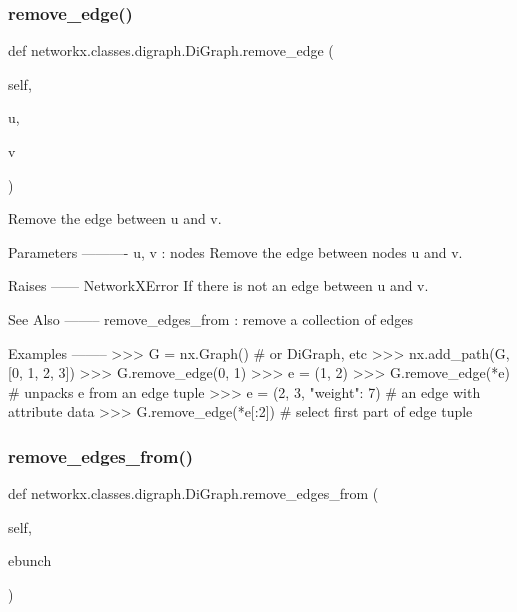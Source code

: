 \subsubsection{\texorpdfstring{remove\+\_\+edge()}{remove\_edge()}}
{\footnotesize\ttfamily def networkx.\+classes.\+digraph.\+Di\+Graph.\+remove\+\_\+edge (\begin{DoxyParamCaption}\item[{}]{self,  }\item[{}]{u,  }\item[{}]{v }\end{DoxyParamCaption})}

\begin{DoxyVerb}Remove the edge between u and v.

Parameters
----------
u, v : nodes
    Remove the edge between nodes u and v.

Raises
------
NetworkXError
    If there is not an edge between u and v.

See Also
--------
remove_edges_from : remove a collection of edges

Examples
--------
>>> G = nx.Graph()  # or DiGraph, etc
>>> nx.add_path(G, [0, 1, 2, 3])
>>> G.remove_edge(0, 1)
>>> e = (1, 2)
>>> G.remove_edge(*e)  # unpacks e from an edge tuple
>>> e = (2, 3, {"weight": 7})  # an edge with attribute data
>>> G.remove_edge(*e[:2])  # select first part of edge tuple
\end{DoxyVerb}
 \mbox{\label{classnetworkx_1_1classes_1_1digraph_1_1DiGraph_a40d5634c72fec954829abffe05aeecba}} 
\subsubsection{\texorpdfstring{remove\+\_\+edges\+\_\+from()}{remove\_edges\_from()}}
{\footnotesize\ttfamily def networkx.\+classes.\+digraph.\+Di\+Graph.\+remove\+\_\+edges\+\_\+from (\begin{DoxyParamCaption}\item[{}]{self,  }\item[{}]{ebunch }\end{DoxyParamCaption})}

